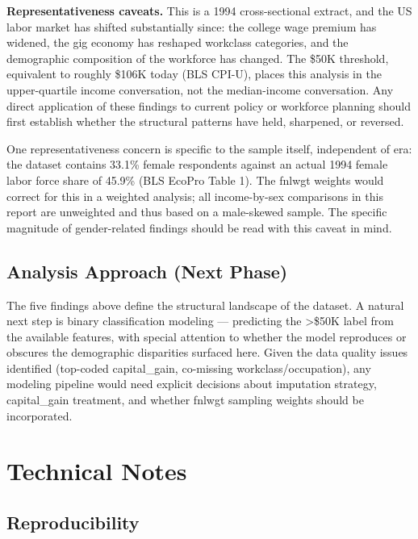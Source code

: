 \documentclass[
  letterpaper,
  DIV=11,
  numbers=noendperiod]{scrartcl}
\begin{document}
\textbf{Representativeness caveats.} This is a 1994 cross-sectional
extract, and the US labor market has shifted substantially since: the
college wage premium has widened, the gig economy has reshaped workclass
categories, and the demographic composition of the workforce has
changed. The \$50K threshold, equivalent to roughly \$106K today (BLS
CPI-U), places this analysis in the upper-quartile income conversation,
not the median-income conversation. Any direct application of these
findings to current policy or workforce planning should first establish
whether the structural patterns have held, sharpened, or reversed.

One representativeness concern is specific to the sample itself,
independent of era: the dataset contains 33.1\% female respondents
against an actual 1994 female labor force share of 45.9\% (BLS EcoPro
Table 1). The fnlwgt weights would correct for this in a weighted
analysis; all income-by-sex comparisons in this report are unweighted
and thus based on a male-skewed sample. The specific magnitude of
gender-related findings should be read with this caveat in mind.

\subsection{Analysis Approach (Next
Phase)}\label{analysis-approach-next-phase}

The five findings above define the structural landscape of the dataset.
A natural next step is binary classification modeling --- predicting the
\textgreater\$50K label from the available features, with special
attention to whether the model reproduces or obscures the demographic
disparities surfaced here. Given the data quality issues identified
(top-coded capital\_gain, co-missing workclass/occupation), any modeling
pipeline would need explicit decisions about imputation strategy,
capital\_gain treatment, and whether fnlwgt sampling weights should be
incorporated.

\section{Technical Notes}\label{technical-notes}

\subsection{Reproducibility}\label{reproducibility}
\end{document}
